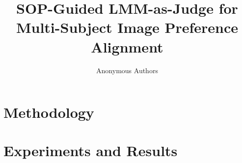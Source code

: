 \documentclass{article}
\title{SOP-Guided LMM-as-Judge for Multi-Subject Image Preference Alignment}
\author{Anonymous Authors}
\date{}
\begin{document}
\maketitle

\section{Methodology}


\section{Experiments and Results}

\end{document}
